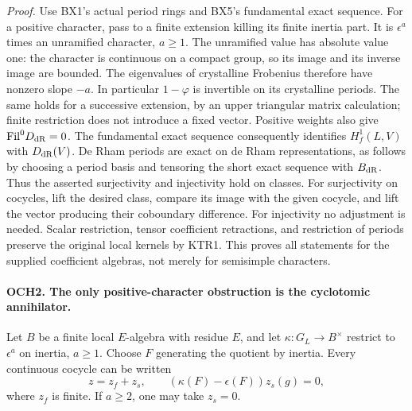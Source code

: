 \documentclass[11pt,a4paper]{article}
\numberwithin{equation}{section}
\theoremstyle{remark}\newtheorem{remark}[theorem]{Remark}
\begin{document}
\emph{Proof.}
Use BX1's actual period rings and BX5's fundamental exact sequence.
For a positive character, pass to a finite extension killing its
finite inertia part.  It is \(\epsilon^a\) times an unramified
character, \(a\ge1\).  The unramified value has absolute value one:
the character is continuous on a compact group, so its image and its
inverse image are bounded.  The eigenvalues of crystalline Frobenius
therefore have nonzero slope \(-a\).  In particular \(1-\varphi\)
is invertible on its crystalline periods.  The same holds for a
successive extension, by an upper triangular matrix calculation;
finite restriction does not introduce a fixed vector.  Positive
weights also give \(\mathrm{Fil}^0D_{\rm dR}=0\).
The fundamental exact sequence consequently identifies
\(H^1_f(L,V)\) with \(D_{\rm dR}(V)\).  De Rham periods are
exact on de Rham representations, as follows by choosing a period
basis and tensoring the short exact sequence with \(B_{\rm dR}\).
Thus the asserted surjectivity and injectivity hold on classes.
For surjectivity on cocycles, lift the desired class, compare its
image with the given cocycle, and lift the vector producing their
coboundary difference.  For injectivity no adjustment is needed.
Scalar restriction, tensor coefficient retractions, and restriction
of periods preserve the original local kernels by KTR1.  This proves
all statements for the supplied coefficient algebras, not merely for
semisimple characters.

\paragraph{OCH2. The only positive-character obstruction is the cyclotomic annihilator.}
\label{claim:OCH2}
Let \(B\) be a finite local \(E\)-algebra with residue \(E\),
and let \(\kappa:G_L\to B^\times\) restrict to \(\epsilon^a\)
on inertia, \(a\ge1\).  Choose \(F\) generating the quotient
by inertia.  Every continuous cocycle can be written
\[
                  z=z_f+z_s,
 \qquad (\kappa(F)-\epsilon(F))z_s(g)=0,
 \tag{OCH.2}
\]
where \(z_f\) is finite.  If \(a\ge2\), one may take
\(z_s=0\).
\end{document}
